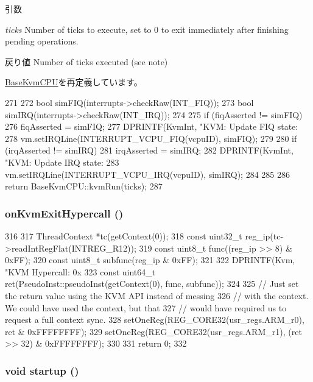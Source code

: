 \begin{DoxyParams}{引数}
\item[{\em ticks}]Number of ticks to execute, set to 0 to exit immediately after finishing pending operations. \end{DoxyParams}
\begin{DoxyReturn}{戻り値}
Number of ticks executed (see note) 
\end{DoxyReturn}


\hyperlink{classBaseKvmCPU_aed3dbd0c0bf26d82ee56367a3f350506}{BaseKvmCPU}を再定義しています。


\begin{DoxyCode}
271 {
272     bool simFIQ(interrupts->checkRaw(INT_FIQ));
273     bool simIRQ(interrupts->checkRaw(INT_IRQ));
274 
275     if (fiqAsserted != simFIQ) {
276         fiqAsserted = simFIQ;
277         DPRINTF(KvmInt, "KVM: Update FIQ state: %
278         vm.setIRQLine(INTERRUPT_VCPU_FIQ(vcpuID), simFIQ);
279     }
280     if (irqAsserted != simIRQ) {
281         irqAsserted = simIRQ;
282         DPRINTF(KvmInt, "KVM: Update IRQ state: %
283         vm.setIRQLine(INTERRUPT_VCPU_IRQ(vcpuID), simIRQ);
284     }
285 
286     return BaseKvmCPU::kvmRun(ticks);
287 }
\end{DoxyCode}
\hypertarget{classArmKvmCPU_ac0b773030a2340b7bdac78ccc7227449}{
\subsubsection[{onKvmExitHypercall}]{ onKvmExitHypercall ()}}
\label{classArmKvmCPU_ac0b773030a2340b7bdac78ccc7227449}



\begin{DoxyCode}
316 {
317     ThreadContext *tc(getContext(0));
318     const uint32_t reg_ip(tc->readIntRegFlat(INTREG_R12));
319     const uint8_t func((reg_ip >> 8) & 0xFF);
320     const uint8_t subfunc(reg_ip & 0xFF);
321 
322     DPRINTF(Kvm, "KVM Hypercall: 0x%
323     const uint64_t ret(PseudoInst::pseudoInst(getContext(0), func, subfunc));
324 
325     // Just set the return value using the KVM API instead of messing
326     // with the context. We could have used the context, but that
327     // would have required us to request a full context sync.
328     setOneReg(REG_CORE32(usr_regs.ARM_r0), ret & 0xFFFFFFFF);
329     setOneReg(REG_CORE32(usr_regs.ARM_r1), (ret >> 32) & 0xFFFFFFFF);
330 
331     return 0;
332 }
\end{DoxyCode}
\hypertarget{classArmKvmCPU_aecc7d8debf54990ffeaaed5bac7d7d81}{
\subsubsection[{startup}]{\setlength{\rightskip}{0pt plus 5cm}void startup ()}}
\label{classArmKvmCPU_aecc7d8debf54990ffeaaed5bac7d7d81}


